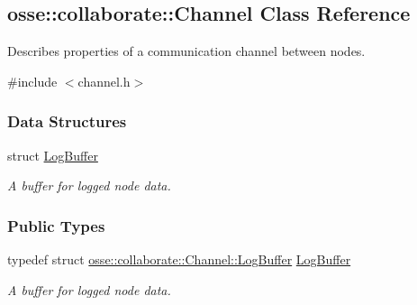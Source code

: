 \hypertarget{classosse_1_1collaborate_1_1_channel}{}\subsection{osse\+:\+:collaborate\+:\+:Channel Class Reference}
\label{classosse_1_1collaborate_1_1_channel}


Describes properties of a communication channel between nodes.  




{\ttfamily \#include $<$channel.\+h$>$}

\subsubsection*{Data Structures}
\begin{DoxyCompactItemize}
\item 
struct \hyperlink{structosse_1_1collaborate_1_1_channel_1_1_log_buffer}{Log\+Buffer}
\begin{DoxyCompactList}\small\item\em A buffer for logged node data. \end{DoxyCompactList}\end{DoxyCompactItemize}
\subsubsection*{Public Types}
\begin{DoxyCompactItemize}
\item 
\mbox{\label{classosse_1_1collaborate_1_1_channel_a39f733e7246a07d8a2741106f5311dd6}} 
typedef struct \hyperlink{structosse_1_1collaborate_1_1_channel_1_1_log_buffer}{osse\+::collaborate\+::\+Channel\+::\+Log\+Buffer} \hyperlink{classosse_1_1collaborate_1_1_channel_a39f733e7246a07d8a2741106f5311dd6}{Log\+Buffer}
\begin{DoxyCompactList}\small\item\em A buffer for logged node data. \end{DoxyCompactList}\end{DoxyCompactItemize}

